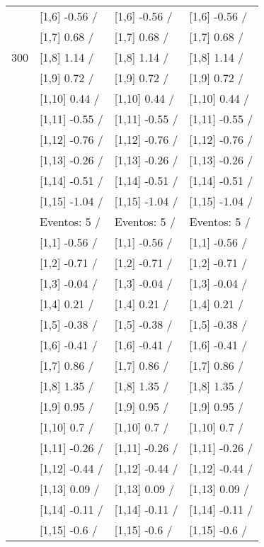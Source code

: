 \begin{table}
\begin{tabular}[t]{llll}
 & {}[1,6] -0.56  / & {}[1,6] -0.56  / & {}[1,6] -0.56  /\\
 & {}[1,7] 0.68  / & {}[1,7] 0.68  / & {}[1,7] 0.68  /\\
300 & {}[1,8] 1.14  / & {}[1,8] 1.14  / & {}[1,8] 1.14  /\\
\addlinespace
 & {}[1,9] 0.72  / & {}[1,9] 0.72  / & {}[1,9] 0.72  /\\
 & {}[1,10] 0.44  / & {}[1,10] 0.44  / & {}[1,10] 0.44  /\\
 & {}[1,11] -0.55  / & {}[1,11] -0.55  / & {}[1,11] -0.55  /\\
 & {}[1,12] -0.76  / & {}[1,12] -0.76  / & {}[1,12] -0.76  /\\
 & {}[1,13] -0.26  / & {}[1,13] -0.26  / & {}[1,13] -0.26  /\\
\addlinespace
 & {}[1,14] -0.51  / & {}[1,14] -0.51  / & {}[1,14] -0.51  /\\
 & {}[1,15] -1.04  / & {}[1,15] -1.04  / & {}[1,15] -1.04  /\\
 & Eventos:  5 / & Eventos:  5 / & Eventos:  5 /\\
 & {}[1,1] -0.56  / & {}[1,1] -0.56  / & {}[1,1] -0.56  /\\
 & {}[1,2] -0.71  / & {}[1,2] -0.71  / & {}[1,2] -0.71  /\\
\addlinespace
 & {}[1,3] -0.04  / & {}[1,3] -0.04  / & {}[1,3] -0.04  /\\
 & {}[1,4] 0.21  / & {}[1,4] 0.21  / & {}[1,4] 0.21  /\\
 & {}[1,5] -0.38  / & {}[1,5] -0.38  / & {}[1,5] -0.38  /\\
 & {}[1,6] -0.41  / & {}[1,6] -0.41  / & {}[1,6] -0.41  /\\
 & {}[1,7] 0.86  / & {}[1,7] 0.86  / & {}[1,7] 0.86  /\\
\addlinespace
500 & {}[1,8] 1.35  / & {}[1,8] 1.35  / & {}[1,8] 1.35  /\\
 & {}[1,9] 0.95  / & {}[1,9] 0.95  / & {}[1,9] 0.95  /\\
 & {}[1,10] 0.7  / & {}[1,10] 0.7  / & {}[1,10] 0.7  /\\
 & {}[1,11] -0.26  / & {}[1,11] -0.26  / & {}[1,11] -0.26  /\\
 & {}[1,12] -0.44  / & {}[1,12] -0.44  / & {}[1,12] -0.44  /\\
\addlinespace
 & {}[1,13] 0.09  / & {}[1,13] 0.09  / & {}[1,13] 0.09  /\\
 & {}[1,14] -0.11  / & {}[1,14] -0.11  / & {}[1,14] -0.11  /\\
 & {}[1,15] -0.6  / & {}[1,15] -0.6  / & {}[1,15] -0.6  /\\
\bottomrule
\end{tabular}
\end{table}

